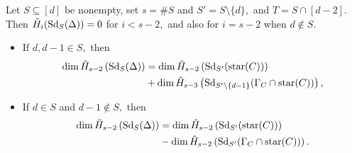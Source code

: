 \begin{proposition}
\label{prop: dimensions formulas for reduced homologies}
    Let $S\subseteq [d]$ be nonempty, set $s = \#S$ and $S' = S\setminus\{d\},$ and $T = S\cap[d-2].$ Then $\Tilde{H}_i(\operatorname{Sd}_S(\Delta)) = 0$ for $i < s-2,$ and also for $i = s - 2$ when $d\not\in S.$ 
    \begin{itemize}
        \item If $d,d-1\in S,$ then
        \begin{align*}
        \dim\Tilde{H}_{s-2}\left(\operatorname{Sd}_S(\Delta)\right) 
        & = \dim\Tilde{H}_{s-2}\left(\operatorname{Sd}_{S'}(\mathrm{star}(C))\right) \\
        & + \dim\Tilde{H}_{s-3}\left(\operatorname{Sd}_{S'\setminus\{d-1\}}(\Gamma_C\cap\mathrm{star}(C))\right), 
    \end{align*}
    \item If $d\in S$ and $d - 1\not\in S,$ then
    \begin{align*}
        \dim\Tilde{H}_{s-2}\left(\operatorname{Sd}_S(\Delta)\right) 
        & = \dim\Tilde{H}_{s-2}\left(\operatorname{Sd}_{S'}(\mathrm{star}(C))\right) \\
        & - \dim\Tilde{H}_{s-2}\left(\operatorname{Sd}_{S'}(\Gamma_C\cap\mathrm{star}(C))\right).
    \end{align*}
    \end{itemize}
\end{proposition}
